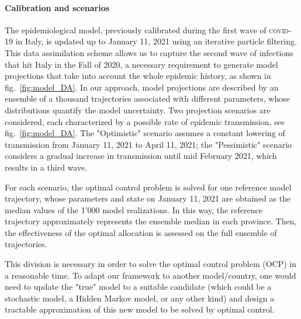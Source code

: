 \paragraph{Calibration and scenarios}The epidemiological model, previously calibrated during the first wave of \textsc{covid}-19 in Italy, is updated up to January 11, 2021 using an iterative particle filtering. This data assimilation scheme allows us to capture the second wave of infections that hit Italy in the Fall of 2020, a necessary requirement to generate model projections that take into account the whole epidemic history, as shown in fig.~\ref{fig:model_DA}. In our approach, model projections are described by an ensemble of a thousand trajectories associated with different parameters, whose distributions quantify the model uncertainty. 
Two projection scenarios are considered, each characterized by a possible rate of epidemic transmission, see fig.~\ref{fig:model_DA}. The "Optimistic" scenario assumes a constant lowering of transmission from January 11, 2021 to April 11, 2021; the "Pessimistic" scenario considers a gradual increase in transmission until mid February 2021, which results in a third wave. 

For each scenario, the optimal control problem is solved for one reference model trajectory, whose parameters and state on January 11, 2021 are obtained as the median values of the 1'000 model realizations. In this way, the reference trajectory approximately represents the ensemble median in each province. Then, the effectiveness of the optimal allocation is assessed on the full ensemble of trajectories.



This division is necessary in order to solve the optimal control problem (OCP) in a reasonable time. To adapt our framework to another model/country, one would need to update the "true" model to a suitable candidate (which could be a stochastic model, a Hidden Markov model, or any other kind) and design a tractable approximation of this new model to be solved by optimal control.

